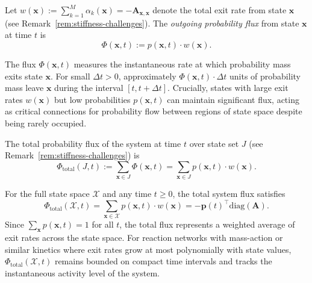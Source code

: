 \documentclass[onefignum,onetabnum]{siamart171218}
\begin{document}
\begin{definition}
\label{def:flux}
Let $w(\boldsymbol{x}) := \sum_{k=1}^M \alpha_k(\boldsymbol{x}) = -\mathbf{A}_{\boldsymbol{x},\boldsymbol{x}}$ denote the total exit rate from state $\boldsymbol{x}$ (see Remark~\ref{rem:stiffness-challenges}). The \textit{outgoing probability flux} from state $\boldsymbol{x}$ at time $t$ is
\begin{equation}
\Phi(\boldsymbol{x},t) := p(\boldsymbol{x},t) \cdot w(\boldsymbol{x}).
\end{equation}
\end{definition}

The flux $\Phi(\boldsymbol{x},t)$ measures the instantaneous rate at which probability mass exits state $\boldsymbol{x}$. For small $\Delta t > 0$, approximately $\Phi(\boldsymbol{x},t) \cdot \Delta t$ units of probability mass leave $\boldsymbol{x}$ during the interval $[t, t+\Delta t]$. Crucially, states with large exit rates $w(\boldsymbol{x})$ but low probabilities $p(\boldsymbol{x},t)$ can maintain significant flux, acting as critical connections for probability flow between regions of state space despite being rarely occupied.

\begin{definition}
\label{def:total-flux}
The total probability flux of the system at time $t$ over state set $J$ (see Remark~\ref{rem:stiffness-challenges}) is
\begin{equation}
\Phi_{\mathrm{total}}(J,t) := \sum_{\boldsymbol{x} \in J} \Phi(\boldsymbol{x},t) = \sum_{\boldsymbol{x} \in J} p(\boldsymbol{x},t) \cdot w(\boldsymbol{x}).
\end{equation}
\end{definition}

\begin{proposition}
\label{prop:total-flux}
For the full state space $\mathcal{X}$ and any time $t \geq 0$, the total system flux satisfies
\begin{equation}
\Phi_{\mathrm{total}}(\mathcal{X},t) = \sum_{\boldsymbol{x} \in \mathcal{X}} p(\boldsymbol{x},t) \cdot w(\boldsymbol{x}) = -\boldsymbol{p}(t)^\top \mathrm{diag}(\mathbf{A}).
\end{equation}
Since $\sum_{\boldsymbol{x}} p(\boldsymbol{x},t) = 1$ for all $t$, the total flux represents a weighted average of exit rates across the state space. For reaction networks with mass-action or similar kinetics where exit rates grow at most polynomially with state values, $\Phi_{\mathrm{total}}(\mathcal{X},t)$ remains bounded on compact time intervals and tracks the instantaneous activity level of the system.
\end{proposition}
\end{document}
